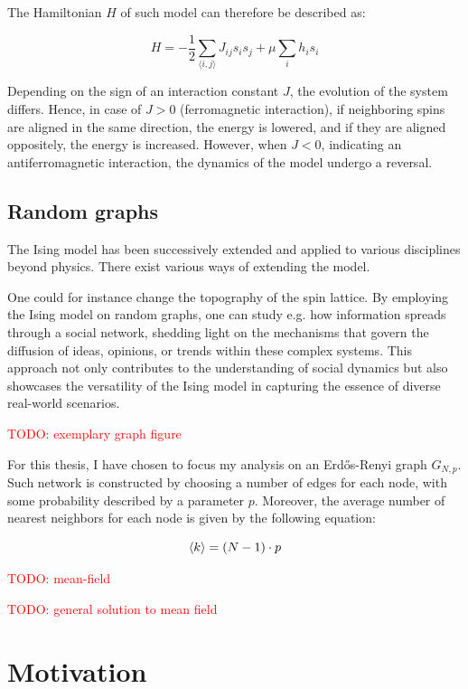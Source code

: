 \documentclass[11pt,a4paper]{article}
\newcommand{\todo}[1]{\textcolor{red}{TODO: #1}}
\begin{document}
The Hamiltonian $H$ of such model can therefore be described as:

\begin{equation}
    H = -\frac12\sum_{\langle i,j \rangle} J_{ij} s_i s_j + \mu\sum_i h_i s_i
\end{equation}

Depending on the sign of an interaction constant $J$, the evolution of the system differs. Hence, in case of $J>0$ (ferromagnetic interaction), if neighboring spins are aligned in the same direction, the energy is lowered, and if they are aligned oppositely, the energy is increased. However, when $J<0$, indicating  an antiferromagnetic interaction, the dynamics of the model undergo a reversal.


\subsection{Random graphs}

The Ising model has been successively extended and applied to various disciplines beyond physics. There exist various ways of extending the model.

One could for instance change the topography of the spin lattice. By employing the Ising model on random graphs, one can study e.g. how information spreads through a social network, shedding light on the mechanisms that govern the diffusion of ideas, opinions, or trends within these complex systems. This approach not only contributes to the understanding of social dynamics but also showcases the versatility of the Ising model in capturing the essence of diverse real-world scenarios.

\todo{exemplary graph figure}

For this thesis, I have chosen to focus my analysis on an Erdős-Renyi graph $G_{N,p}$. Such network is constructed by choosing a number of edges for each node, with some probability described by a parameter $p$. Moreover, the average number of nearest neighbors for each node is given by the following equation:

\begin{equation}
    \braket{k} = (N-1) \cdot p
\end{equation}

\todo{mean-field}

\todo{general solution to mean field}


\section{Motivation}
\end{document}
